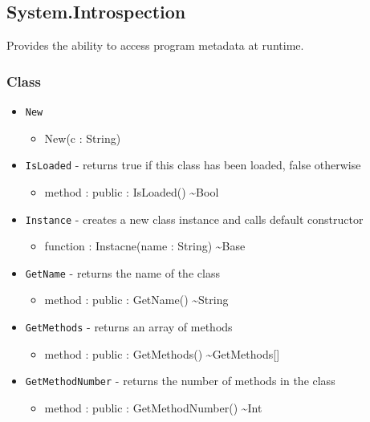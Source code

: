 \documentclass[11pt]{article}
\begin{document}
\subsection{System.Introspection}
Provides the ability to access program metadata at runtime.

\subsubsection{Class}
\begin{itemize}
\item \texttt{New}
  \begin{itemize}
  \item New(c : String)
  \end{itemize}
\item \texttt{IsLoaded} - returns true if this class has been loaded,
  false otherwise
  \begin{itemize}
  \item method : public : IsLoaded() \textasciitilde Bool
  \end{itemize}
\item \texttt{Instance} - creates a new class instance and calls
  default constructor
  \begin{itemize}
  \item function : Instacne(name : String) \textasciitilde Base
  \end{itemize}
\item \texttt{GetName} - returns the name of the class
  \begin{itemize}
  \item method : public : GetName() \textasciitilde String
  \end{itemize}
\item \texttt{GetMethods} - returns an array of methods
  \begin{itemize}
  \item method : public : GetMethods() \textasciitilde GetMethods[]
  \end{itemize}
\item \texttt{GetMethodNumber} - returns the number of methods in the
  class
  \begin{itemize}
  \item method : public : GetMethodNumber() \textasciitilde Int
  \end{itemize}
\end{itemize}
\end{document}
